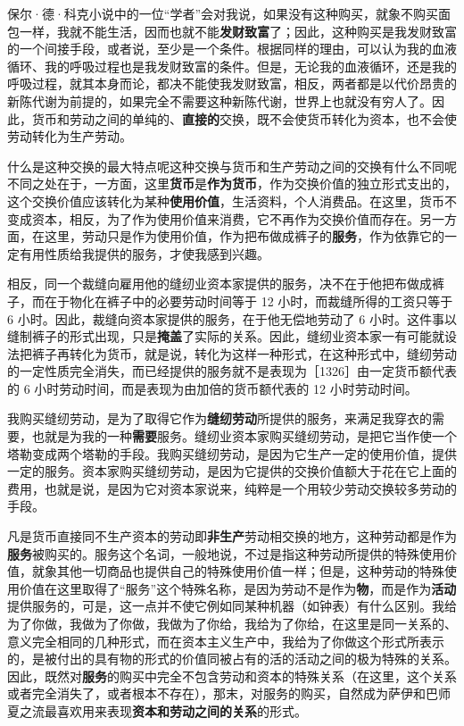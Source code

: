 保尔·德·科克小说中的一位“学者”会对我说，如果没有这种购买，就象不购买面包一样，我就不能生活，因而也就不能\textbf{发财致富}了；因此，这种购买是我发财致富的一个间接手段，或者说，至少是一个条件。根据同样的理由，可以认为我的血液循环、我的呼吸过程也是我发财致富的条件。但是，无论我的血液循环，还是我的呼吸过程，就其本身而论，都决不能使我发财致富，相反，两者都是以代价昂贵的新陈代谢为前提的，如果完全不需要这种新陈代谢，世界上也就没有穷人了。因此，货币和劳动之间的单纯的、\textbf{直接的}交换，既不会使货币转化为资本，也不会使劳动转化为生产劳动。

什么是这种交换的最大特点呢这种交换与货币和生产劳动之间的交换有什么不同呢不同之处在于，一方面，这里\textbf{货币}是\textbf{作为货币}，作为交换价值的独立形式支出的，这个交换价值应该转化为某种\textbf{使用价值}，生活资料，个人消费品。在这里，货币不变成资本，相反，为了作为使用价值来消费，它不再作为交换价值而存在。另一方面，在这里，劳动只是作为使用价值，作为把布做成裤子的\textbf{服务}，作为依靠它的一定有用性质给我提供的服务，才使我感到兴趣。

相反，同一个裁缝向雇用他的缝纫业资本家提供的服务，决不在于他把布做成裤子，而在于物化在裤子中的必要劳动时间等于 12 小时，而裁缝所得的工资只等于 6 小时。因此，裁缝向资本家提供的服务，在于他无偿地劳动了 6 小时。这件事以缝制裤子的形式出现，只是\textbf{掩盖}了实际的关系。因此，缝纫业资本家一有可能就设法把裤子再转化为货币，就是说，转化为这样一种形式，在这种形式中，缝纫劳动的一定性质完全消失，而已经提供的服务就不是表现为［1326］由一定货币额代表的 6 小时劳动时间，而是表现为由加倍的货币额代表的 12 小时劳动时间。

我购买缝纫劳动，是为了取得它作为\textbf{缝纫劳动}所提供的服务，来满足我穿衣的需要，也就是为我的一种\textbf{需要}服务。缝纫业资本家购买缝纫劳动，是把它当作使一个塔勒变成两个塔勒的手段。我购买缝纫劳动，是因为它生产一定的使用价值，提供一定的服务。资本家购买缝纫劳动，是因为它提供的交换价值额大于花在它上面的费用，也就是说，是因为它对资本家说来，纯粹是一个用较少劳动交换较多劳动的手段。

凡是货币直接同不生产资本的劳动即\textbf{非生产}劳动相交换的地方，这种劳动都是作为\textbf{服务}被购买的。服务这个名词，一般地说，不过是指这种劳动所提供的特殊使用价值，就象其他一切商品也提供自己的特殊使用价值一样；但是，这种劳动的特殊使用价值在这里取得了“服务”这个特殊名称，是因为劳动不是作为\textbf{物}，而是作为\textbf{活动}提供服务的，可是，这一点并不使它例如同某种机器（如钟表）有什么区别。我给为了你做，我做为了你做，我做为了你给，我给为了你给，在这里是同一关系的、意义完全相同的几种形式，而在资本主义生产中，我给为了你做这个形式所表示的，是被付出的具有物的形式的价值同被占有的活的活动之间的极为特殊的关系。因此，既然对\textbf{服务}的购买中完全不包含劳动和资本的特殊关系（在这里，这个关系或者完全消失了，或者根本不存在），那末，对服务的购买，自然成为萨伊和巴师夏之流最喜欢用来表现\textbf{资本和劳动之间的关系}的形式。

